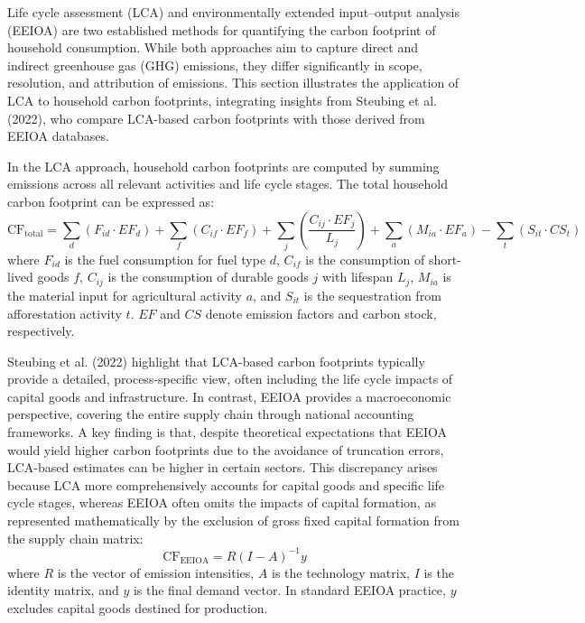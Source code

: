 \documentclass[12pt,a4paper]{article}%
\begin{document}
Life cycle assessment (LCA) and environmentally extended input--output analysis (EEIOA) are two established methods for quantifying the carbon footprint of household consumption. While both approaches aim to capture direct and indirect greenhouse gas (GHG) emissions, they differ significantly in scope, resolution, and attribution of emissions. This section illustrates the application of LCA to household carbon footprints, integrating insights from Steubing et al. (2022), who compare LCA-based carbon footprints with those derived from EEIOA databases.

In the LCA approach, household carbon footprints are computed by summing emissions across all relevant activities and life cycle stages. The total household carbon footprint can be expressed as:
\begin{equation}
\text{CF}_{\text{total}} = \sum_d (F_{id} \cdot EF_d) 
+ \sum_f (C_{if} \cdot EF_f) 
+ \sum_j \left( \frac{C_{ij} \cdot EF_j}{L_j} \right)
+ \sum_a (M_{ia} \cdot EF_a)
- \sum_t (S_{it} \cdot CS_t)
\end{equation}
where $F_{id}$ is the fuel consumption for fuel type $d$, $C_{if}$ is the consumption of short-lived goods $f$, $C_{ij}$ is the consumption of durable goods $j$ with lifespan $L_j$, $M_{ia}$ is the material input for agricultural activity $a$, and $S_{it}$ is the sequestration from afforestation activity $t$. $EF$ and $CS$ denote emission factors and carbon stock, respectively.

Steubing et al. (2022) highlight that LCA-based carbon footprints typically provide a detailed, process-specific view, often including the life cycle impacts of capital goods and infrastructure. In contrast, EEIOA provides a macroeconomic perspective, covering the entire supply chain through national accounting frameworks. A key finding is that, despite theoretical expectations that EEIOA would yield higher carbon footprints due to the avoidance of truncation errors, LCA-based estimates can be higher in certain sectors. This discrepancy arises because LCA more comprehensively accounts for capital goods and specific life cycle stages, whereas EEIOA often omits the impacts of capital formation, as represented mathematically by the exclusion of gross fixed capital formation from the supply chain matrix:
\begin{equation}
\text{CF}_{\text{EEIOA}} = R {(I - A)}^{-1} y
\end{equation}
where $R$ is the vector of emission intensities, $A$ is the technology matrix, $I$ is the identity matrix, and $y$ is the final demand vector. In standard EEIOA practice, $y$ excludes capital goods destined for production.
\end{document}
